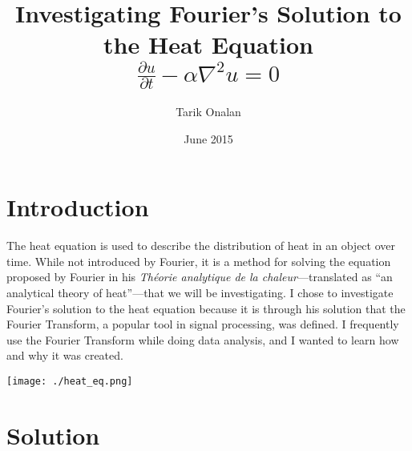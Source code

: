 \documentclass[a4paper]{article}
\title{Investigating Fourier's Solution to the Heat Equation\\$\frac{\partial{u}}{\partial{t}}-\alpha\nabla^{2}u=0$}
\date{June 2015}
\author{Tarik Onalan}
\begin{document}
    
    

    \maketitle


    \tableofcontents


    \section{Introduction}

        The heat equation is used to describe the distribution of heat in an object over time. While
        not introduced by Fourier, it is a method for solving the equation proposed by Fourier in
        his \textit{Théorie analytique de la chaleur}---translated as ``an analytical theory of
        heat''---that we will be investigating. I chose to investigate Fourier's solution to the heat
        equation because it is through his solution that the Fourier Transform, a popular tool in signal
        processing, was defined. I frequently use the Fourier Transform while doing data analysis, and I
        wanted to learn how and why it was created.

        \begin{center}
            \texttt{[image: ./heat\_eq.png]}
        \end{center}


    \section{Solution}
\end{document}
